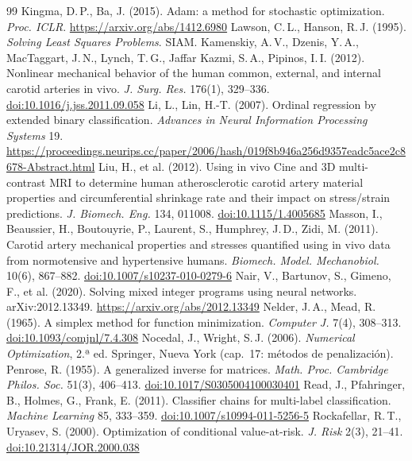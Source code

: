 \begin{thebibliography}{99}
 Kingma, D.\,P., Ba, J. (2015). Adam: a method for stochastic optimization. \emph{Proc. ICLR}. \url{https://arxiv.org/abs/1412.6980}
 Lawson, C.\,L., Hanson, R.\,J. (1995). \emph{Solving Least Squares Problems}. SIAM.
 Kamenskiy, A.\,V., Dzenis, Y.\,A., MacTaggart, J.\,N., Lynch, T.\,G., Jaffar Kazmi, S.\,A., Pipinos, I.\,I. (2012). Nonlinear mechanical behavior of the human common, external, and internal carotid arteries in vivo. \emph{J. Surg. Res.} 176(1), 329--336. \href{https://doi.org/10.1016/j.jss.2011.09.058}{doi:10.1016/j.jss.2011.09.058}
 Li, L., Lin, H.-T. (2007). Ordinal regression by extended binary classification. \emph{Advances in Neural Information Processing Systems} 19. \url{https://proceedings.neurips.cc/paper/2006/hash/019f8b946a256d9357eadc5ace2c8678-Abstract.html}
 Liu, H., et al. (2012). Using in vivo Cine and 3D multi-contrast MRI to determine human atherosclerotic carotid artery material properties and circumferential shrinkage rate and their impact on stress/strain predictions. \emph{J. Biomech. Eng.} 134, 011008. \href{https://doi.org/10.1115/1.4005685}{doi:10.1115/1.4005685}
 Masson, I., Beaussier, H., Boutouyrie, P., Laurent, S., Humphrey, J.\,D., Zidi, M. (2011). Carotid artery mechanical properties and stresses quantified using in vivo data from normotensive and hypertensive humans. \emph{Biomech. Model. Mechanobiol.} 10(6), 867--882. \href{https://doi.org/10.1007/s10237-010-0279-6}{doi:10.1007/s10237-010-0279-6}
 Nair, V., Bartunov, S., Gimeno, F., et al. (2020). Solving mixed integer programs using neural networks. arXiv:2012.13349. \url{https://arxiv.org/abs/2012.13349}
 Nelder, J.\,A., Mead, R. (1965). A simplex method for function minimization. \emph{Computer J.} 7(4), 308--313. \href{https://doi.org/10.1093/comjnl/7.4.308}{doi:10.1093/comjnl/7.4.308}
 Nocedal, J., Wright, S.\,J. (2006). \emph{Numerical Optimization}, 2.ª ed. Springer, Nueva York (cap.~17: métodos de penalización).
 Penrose, R. (1955). A generalized inverse for matrices. \emph{Math. Proc. Cambridge Philos. Soc.} 51(3), 406--413. \href{https://doi.org/10.1017/S0305004100030401}{doi:10.1017/S0305004100030401}
 Read, J., Pfahringer, B., Holmes, G., Frank, E. (2011). Classifier chains for multi-label classification. \emph{Machine Learning} 85, 333--359. \href{https://doi.org/10.1007/s10994-011-5256-5}{doi:10.1007/s10994-011-5256-5}
 Rockafellar, R.\,T., Uryasev, S. (2000). Optimization of conditional value-at-risk. \emph{J. Risk} 2(3), 21--41. \href{https://doi.org/10.21314/JOR.2000.038}{doi:10.21314/JOR.2000.038}

\end{thebibliography}
